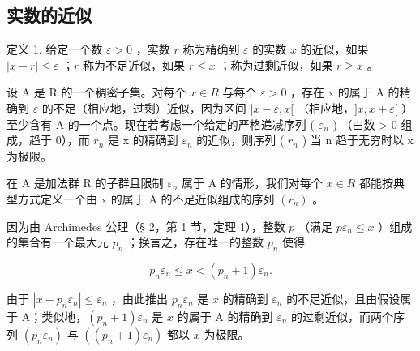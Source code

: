 \subsection{实数的近似}

定义 1. 给定一个数 \(\varepsilon > 0\) ，实数 \(r\) 称为精确到 \(\varepsilon\) 的实数 \(x\) 的近似，如果 \(|x - r| \leqslant \varepsilon\) ；\(r\) 称为不足近似，如果 \(r \leqslant x\) ；称为过剩近似，如果 \(r \geqslant x\) 。

设 A 是 R 的一个稠密子集。对每个 \(x \in R\) 与每个 \(\varepsilon > 0\) ，存在 x 的属于 A 的精确到 \(\varepsilon\) 的不足（相应地，过剩）近似，因为区间 \(]x - \varepsilon, x[\) （相应地，\(]x, x + \varepsilon[\) ）至少含有 A 的一个点。现在若考虑一个给定的严格递减序列 ( \(\varepsilon_{n}\) ) （由数 \textgreater{} 0 组成，趋于 0），而 \(r_{n}\) 是 x 的精确到 \(\varepsilon_{n}\) 的近似，则序列 ( \(r_{n}\) ) 当 n 趋于无穷时以 x 为极限。

在 A 是加法群 R 的子群且限制 \(\varepsilon_{n}\) 属于 A 的情形，我们对每个 \(x \in R\) 都能按典型方式定义一个由 x 的属于 A 的不足近似组成的序列 \((r_{n})\) 。

因为由 Archimedes 公理（§ 2，第 1 节，定理 1），整数 \(p\) （满足 \(p\varepsilon_n \leqslant x\) ）组成的集合有一个最大元 \(p_n\) ；换言之，存在唯一的整数 \(p_n\) 使得

\[
p _ {n} \varepsilon_ {n} \leqslant x <   (p _ {n} + 1) \varepsilon_ {n}.\tag{1}
\]

由于 \(|x - p_n\varepsilon_n| \leqslant \varepsilon_n\) ，由此推出 \(p_n\varepsilon_n\) 是 \(x\) 的精确到 \(\varepsilon_n\) 的不足近似，且由假设属于 A；类似地，\((p_n + 1)\varepsilon_n\) 是 \(x\) 的属于 A 的精确到 \(\varepsilon_n\) 的过剩近似，而两个序列 \((p_n\varepsilon_n)\) 与 \(((p_n + 1)\varepsilon_n)\) 都以 \(x\) 为极限。

